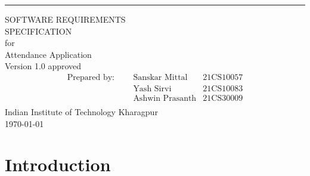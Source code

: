 \documentclass{scrreprt}
\date{}
\def\myversion{1.0 }
\begin{document}
\begin{flushright}
    \rule{16cm}{5pt}\vskip1cm
    \begin{bfseries}
        \Huge{SOFTWARE REQUIREMENTS\\ SPECIFICATION}\\
        \vspace{1cm}
        for\\
        \vspace{1cm}
        Attendance Application\\
        \vspace{1cm}
        \LARGE{Version \myversion approved}\\
        \vspace{0cm}
        \begin{align*}
        \text{Prepared by: } \;\;\;\; 
         &\text{Sanskar Mittal} &\text{21CS10057}\\
         &\text{Yash Sirvi} &\text{21CS10083}\\
         &\text{Ashwin Prasanth} &\text{21CS30009}\\
        \end{align*}
        \vspace{1.9cm}
        Indian Institute of Technology Kharagpur\\
        \vspace{1.9cm}
        \today\\
    \end{bfseries}
\end{flushright}

\tableofcontents




\chapter{Introduction}
\end{document}
